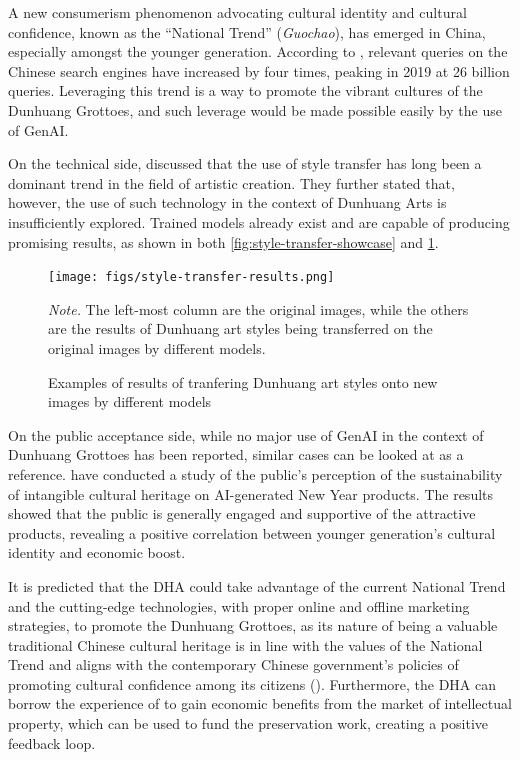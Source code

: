 A new consumerism phenomenon advocating cultural identity and cultural confidence, known as the ``National Trend''
(\textit{Guochao}), has emerged in China, especially amongst the younger generation. According to
, relevant queries on the Chinese search engines have increased by four times,
peaking in 2019 at 26 billion queries. Leveraging this trend is a way to promote the vibrant cultures of the
Dunhuang Grottoes, and such leverage would be made possible easily by the use of GenAI.

On the technical side,  discussed that the use of style transfer has
long been a dominant trend in the field of artistic creation. They further stated that, however, the use of such
technology in the context of Dunhuang Arts is insufficiently explored. Trained models already exist and are capable
of producing promising results, as shown in both \cref{fig:style-transfer-showcase} and
\cref{fig:style-transfer-showcase-2}.

\begin{figure}
    \caption{Examples of results of tranfering Dunhuang art styles onto new images by different models}
    \label{fig:style-transfer-showcase-2}

    \begin{center}
        \texttt{[image: figs/style-transfer-results.png]}
    \end{center}

    \small\textit{Note.} The left-most column are the original images, while the others are the results of
    Dunhuang art styles being transferred on the original images by different models.
\end{figure}

On the public acceptance side, while no major use of GenAI in the context of Dunhuang Grottoes has been reported,
similar cases can be looked at as a reference.  have conducted a study
of the public's perception of the sustainability of intangible cultural heritage on AI-generated New Year products.
The results showed that the public is generally engaged and supportive of the attractive products, revealing a
positive correlation between younger generation's cultural identity and economic boost.

It is predicted that the DHA could take advantage of the current National Trend and the cutting-edge technologies,
with proper online and offline marketing strategies, to promote the Dunhuang Grottoes, as its nature of being a
valuable traditional Chinese cultural heritage is in line with the values of the National Trend and aligns with
the contemporary Chinese government's policies of promoting cultural confidence among its citizens
(). Furthermore, the DHA can borrow the experience of
 to gain economic benefits from the market of intellectual
property, which can be used to fund the preservation work, creating a positive feedback loop.

